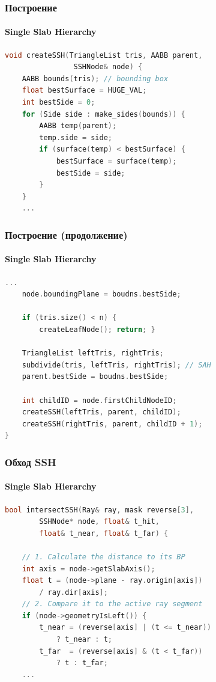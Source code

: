 \begin{frame}[fragile]
    \frametitle{Построение}
    \framesubtitle{Single Slab Hierarchy}

    \begin{lstlisting}[language=C++,basicstyle=\ttfamily,keywordstyle=\color{blue}]
void createSSH(TriangleList tris, AABB parent,
                SSHNode& node) {
    AABB bounds(tris); // bounding box
    float bestSurface = HUGE_VAL;
    int bestSide = 0;
    for (Side side : make_sides(bounds)) {
        AABB temp(parent);
        temp.side = side;
        if (surface(temp) < bestSurface) {
            bestSurface = surface(temp);
            bestSide = side;
        }
    }
    ...

    \end{lstlisting}

\end{frame}

\begin{frame}[fragile]
    \frametitle{Построение (продолжение)}
    \framesubtitle{Single Slab Hierarchy}
    \begin{lstlisting}[language=C++,basicstyle=\ttfamily,keywordstyle=\color{blue}]
    ...
    node.boundingPlane = boudns.bestSide;

    if (tris.size() < n) {
        createLeafNode(); return; }

    TriangleList leftTris, rightTris;
    subdivide(tris, leftTris, rightTris); // SAH
    parent.bestSide = boudns.bestSide;

    int childID = node.firstChildNodeID;
    createSSH(leftTris, parent, childID);
    createSSH(rightTris, parent, childID + 1);
}
    \end{lstlisting}
\end{frame}

\begin{frame}[fragile]
    \frametitle{Обход SSH}
    \framesubtitle{Single Slab Hierarchy}
    \begin{lstlisting}[language=C++,basicstyle=\ttfamily,keywordstyle=\color{blue}]
bool intersectSSH(Ray& ray, mask reverse[3],
        SSHNode* node, float& t_hit,
        float& t_near, float& t_far) {

    // 1. Calculate the distance to its BP
    int axis = node->getSlabAxis();
    float t = (node->plane - ray.origin[axis])
        / ray.dir[axis];
    // 2. Compare it to the active ray segment
    if (node->geometryIsLeft()) {
        t_near = (reverse[axis] | (t <= t_near))
            ? t_near : t;
        t_far  = (reverse[axis] & (t < t_far))
            ? t : t_far;
    ...

    \end{lstlisting}
\end{frame}

